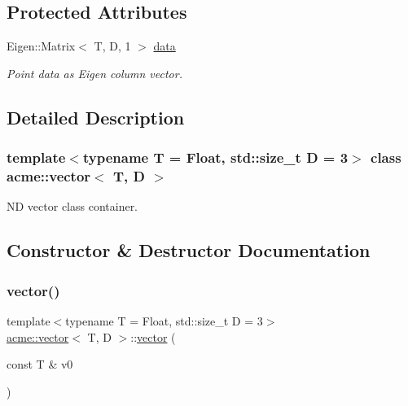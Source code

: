 \subsection*{Protected Attributes}
\begin{DoxyCompactItemize}
\item 
\mbox{\label{classacme_1_1point_a7532a61c7031fddbef1ea217cd916c4c}} 
Eigen\+::\+Matrix$<$ T, D, 1 $>$ \hyperlink{classacme_1_1point_a7532a61c7031fddbef1ea217cd916c4c}{data}
\begin{DoxyCompactList}\small\item\em Point data as Eigen column vector. \end{DoxyCompactList}\end{DoxyCompactItemize}


\subsection{Detailed Description}
\subsubsection*{template$<$typename T = Float, std\+::size\+\_\+t D = 3$>$\newline
class acme\+::vector$<$ T, D $>$}

ND vector class container. 

\subsection{Constructor \& Destructor Documentation}
\mbox{\label{classacme_1_1vector_aa29b7e609acdb3ed9485a3c8864f2b5c}} 
\subsubsection{\texorpdfstring{vector()}{vector()}\hspace{0.1cm}{\footnotesize\ttfamily [1/5]}}
{\footnotesize\ttfamily template$<$typename T = Float, std\+::size\+\_\+t D = 3$>$ \\
\hyperlink{classacme_1_1vector}{acme\+::vector}$<$ T, D $>$\+::\hyperlink{classacme_1_1vector}{vector} (\begin{DoxyParamCaption}\item[{const T \&}]{v0 }\end{DoxyParamCaption})\hspace{0.3cm}{\ttfamily [inline]}}



